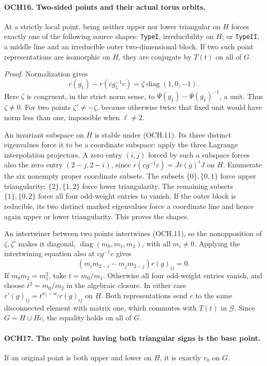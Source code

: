 \documentclass[11pt,a4paper]{article}
\numberwithin{equation}{section}
\theoremstyle{remark}\newtheorem{remark}[theorem]{Remark}
\begin{document}
\paragraph{OCH16. Two-sided points and their actual torus orbits.}
\label{claim:OCH16}
At a strictly local point, being neither upper nor lower triangular
on \(H\) forces exactly one of the following source shapes:
\texttt{Type\allowbreak I}, irreducibility on \(H\); or \texttt{Type\allowbreak II},
a middle line and an irreducible outer two-dimensional block.
If two such point representations are isomorphic on \(H\),
they are conjugate by \(T(t)\) on all of \(G\).

\emph{Proof.}
Normalization gives
\[
 r(g_1)-r(cg_1^{-1}c)=\zeta\operatorname{diag}(1,0,-1).
 \tag{OCH.11}
\]
Here \(\zeta\) is congruent, in the strict norm sense, to
\(\Psi(g_1)-\Psi(g_1)^{-1}\), a unit.  Thus \(\zeta\ne0\).
For two points \(\zeta'\ne-\zeta\), because otherwise twice
that fixed unit would have norm less than one, impossible when
\(\ell\ne2\).

An invariant subspace on \(H\) is stable under (OCH.11).
Its three distinct eigenvalues force it to be a coordinate subspace:
apply the three Lagrange interpolation projectors.  A zero entry
\((i,j)\) forced by such a subspace forces also the zero entry
\((2-j,2-i)\), since
\(r(cg^{-1}c)=Jr(g)^tJ\) on \(H\).
Enumerate the six nonempty proper coordinate subsets.
The subsets \(\{0\},\{0,1\}\) force upper triangularity;
\(\{2\},\{1,2\}\) force lower triangularity.
The remaining subsets \(\{1\},\{0,2\}\) force all four
odd-weight entries to vanish.  If the outer block is reducible,
its two distinct marked eigenvalues force a coordinate line and
hence again upper or lower triangularity.  This proves the shapes.

An intertwiner between two points intertwines (OCH.11), so the
nonopposition of \(\zeta,\zeta'\) makes it diagonal,
\(\operatorname{diag}(m_0,m_1,m_2)\), with all \(m_i\ne0\).
Applying the intertwining equation also at \(cg^{-1}c\) gives
\[
 (m_im_{2-i}-m_jm_{2-j})r(g)_{ij}=0.
\]
If \(m_0m_2=m_1^2\), take \(t=m_0/m_1\).
Otherwise all four odd-weight entries vanish, and choose
\(t^2=m_0/m_2\) in the algebraic closure.  In either case
\(r'(g)_{ij}=t^{w_i-w_j}r(g)_{ij}\) on \(H\).
Both representations send \(c\) to the same disconnected element
with matrix one, which commutes with \(T(t)\) in \(\mathcal G\).
Since \(G=H\sqcup Hc\), the equality holds on all of \(G\).

\paragraph{OCH17. The only point having both triangular signs is the base point.}
\label{claim:OCH17}
If an original point is both upper and lower on \(H\), it is
exactly \(r_0\) on \(G\).
\end{document}
